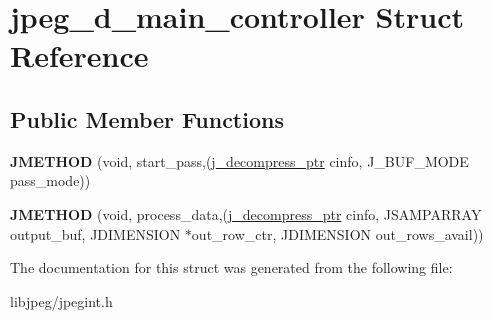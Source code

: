 \hypertarget{structjpeg__d__main__controller}{\section{jpeg\-\_\-d\-\_\-main\-\_\-controller Struct Reference}
\label{structjpeg__d__main__controller}
}
\subsection*{Public Member Functions}
\begin{DoxyCompactItemize}
\item 
\hypertarget{structjpeg__d__main__controller_a6fd68ad0d0296dcc299119db1128c294}{{\bfseries J\-M\-E\-T\-H\-O\-D} (void, start\-\_\-pass,(\hyperlink{structjpeg__decompress__struct}{j\-\_\-decompress\-\_\-ptr} cinfo, J\-\_\-\-B\-U\-F\-\_\-\-M\-O\-D\-E pass\-\_\-mode))}\label{structjpeg__d__main__controller_a6fd68ad0d0296dcc299119db1128c294}

\item 
\hypertarget{structjpeg__d__main__controller_affd488d3ef78b5080ec5b2a00c8198a5}{{\bfseries J\-M\-E\-T\-H\-O\-D} (void, process\-\_\-data,(\hyperlink{structjpeg__decompress__struct}{j\-\_\-decompress\-\_\-ptr} cinfo, J\-S\-A\-M\-P\-A\-R\-R\-A\-Y output\-\_\-buf, J\-D\-I\-M\-E\-N\-S\-I\-O\-N $\ast$out\-\_\-row\-\_\-ctr, J\-D\-I\-M\-E\-N\-S\-I\-O\-N out\-\_\-rows\-\_\-avail))}\label{structjpeg__d__main__controller_affd488d3ef78b5080ec5b2a00c8198a5}

\end{DoxyCompactItemize}


The documentation for this struct was generated from the following file\-:\begin{DoxyCompactItemize}
\item 
libjpeg/jpegint.\-h\end{DoxyCompactItemize}
